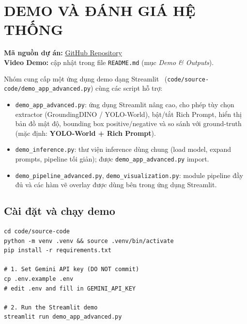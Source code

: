 \documentclass[a4paper,12pt]{report}
\numberwithin{figure}{chapter}
\numberwithin{table}{chapter}
\begin{document}
\chapter{DEMO VÀ ĐÁNH GIÁ HỆ THỐNG}
\label{ch:demo}

\begin{flushleft}
    \textbf{Mã nguồn dự án:} \href{https://github.com/paht2005/CS338.Q21_Zero-shot-Object-Coutning-with-Good-Examplers}{GitHub Repository} \\
    \textbf{Video Demo:} cập nhật trong file \texttt{README.md} (mục \emph{Demo \& Outputs}).
\end{flushleft}

Nhóm cung cấp một ứng dụng demo dạng Streamlit~\cite{streamlit} (\texttt{code/source-code/demo\_app\_advanced.py}) cùng các script hỗ trợ:

\begin{itemize}
    \item \texttt{demo\_app\_advanced.py}: ứng dụng Streamlit nâng cao, cho phép tùy chọn extractor (GroundingDINO / YOLO-World), bật/tắt Rich Prompt, hiển thị bản đồ mật độ, bounding box positive/negative và so sánh với ground-truth (mặc định: \textbf{YOLO-World + Rich Prompt}).
    \item \texttt{demo\_inference.py}: thư viện inference dùng chung (load model, expand prompts, pipeline tối giản); được \texttt{demo\_app\_advanced.py} import.
    \item \texttt{demo\_pipeline\_advanced.py}, \texttt{demo\_visualization.py}: module pipeline đầy đủ và các hàm vẽ overlay được dùng bên trong ứng dụng Streamlit.
\end{itemize}

\section{Cài đặt và chạy demo}

\begin{lstlisting}[style=bashstyle]
cd code/source-code
python -m venv .venv && source .venv/bin/activate
pip install -r requirements.txt

# 1. Set Gemini API key (DO NOT commit)
cp .env.example .env
# edit .env and fill in GEMINI_API_KEY

# 2. Run the Streamlit demo
streamlit run demo_app_advanced.py
\end{lstlisting}
\end{document}
